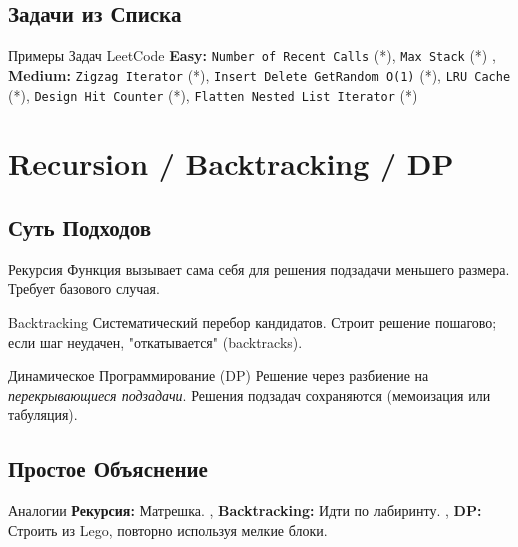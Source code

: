 \subsection{Задачи из Списка}
\begin{myblock}{Примеры Задач LeetCode}
    \textbf{Easy:} \texttt{Number of Recent Calls} (*), \texttt{Max Stack} (*) \sep
    \textbf{Medium:} \texttt{Zigzag Iterator} (*), \texttt{Insert Delete GetRandom O(1)} (*), \texttt{LRU Cache} (*), \texttt{Design Hit Counter} (*), \texttt{Flatten Nested List Iterator} (*)
\end{myblock}

\section{Recursion / Backtracking / DP}

\subsection{Суть Подходов}
\begin{myblock}{Рекурсия}
    Функция вызывает сама себя для решения подзадачи меньшего размера. Требует базового случая.
\end{myblock}
\begin{myblock}{Backtracking}
    Систематический перебор кандидатов. Строит решение пошагово; если шаг неудачен, "откатывается" (backtracks).
\end{myblock}
\begin{myblock}{Динамическое Программирование (DP)}
    Решение через разбиение на \emph{перекрывающиеся подзадачи}. Решения подзадач сохраняются (мемоизация или табуляция).
\end{myblock}

\subsection{Простое Объяснение}
\begin{myblock}{Аналогии}
    \textbf{Рекурсия:} Матрешка. \sep
    \textbf{Backtracking:} Идти по лабиринту. \sep
    \textbf{DP:} Строить из Lego, повторно используя мелкие блоки.
\end{myblock}

